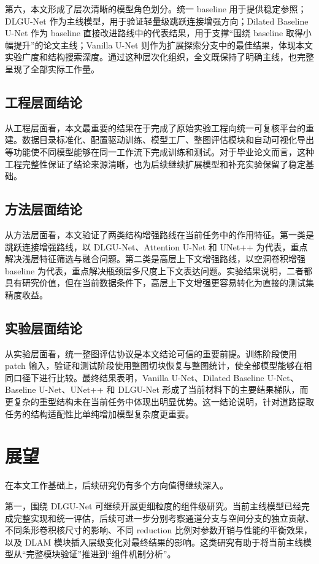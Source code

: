 第六，本文形成了层次清晰的模型角色划分。统一 baseline 用于提供稳定参照；DLGU-Net 作为主线模型，用于验证轻量级跳跃连接增强方向；Dilated Baseline U-Net 作为 baseline 直接改进路线中的代表结果，用于支撑“围绕 baseline 取得小幅提升”的论文主线；Vanilla U-Net 则作为扩展探索分支中的最佳结果，体现本文实验广度和结构搜索深度。通过这种层次化组织，全文既保持了明确主线，也完整呈现了全部实际工作量。

\subsection*{工程层面结论}
从工程层面看，本文最重要的结果在于完成了原始实验工程向统一可复核平台的重建。数据目录标准化、配置驱动训练、模型工厂、整图评估模块和自动可视化导出等功能使不同模型能够在同一工作流下完成训练和测试。对于毕业论文而言，这种工程完整性保证了结论来源清晰，也为后续继续扩展模型和补充实验保留了稳定基础。

\subsection*{方法层面结论}
从方法层面看，本文验证了两类结构增强路线在当前任务中的作用特征。第一类是跳跃连接增强路线，以 DLGU-Net、Attention U-Net 和 UNet++ 为代表，重点解决浅层特征筛选与融合问题。第二类是高层上下文增强路线，以空洞卷积增强 baseline 为代表，重点解决瓶颈层多尺度上下文表达问题。实验结果说明，二者都具有研究价值，但在当前数据条件下，高层上下文增强更容易转化为直接的测试集精度收益。

\subsection*{实验层面结论}
从实验层面看，统一整图评估协议是本文结论可信的重要前提。训练阶段使用 patch 输入，验证和测试阶段使用整图切块恢复与整图统计，使全部模型能够在相同口径下进行比较。最终结果表明，Vanilla U-Net、Dilated Baseline U-Net、Baseline U-Net、UNet++ 和 DLGU-Net 形成了当前材料下的主要结果梯队，而更复杂的重型结构未在当前任务中体现出明显优势。这一结论说明，针对道路提取任务的结构适配性比单纯增加模型复杂度更重要。

\section{展望}
在本文工作基础上，后续研究仍有多个方向值得继续深入。

第一，围绕 DLGU-Net 可继续开展更细粒度的组件级研究。当前主线模型已经完成完整实现和统一评估，后续可进一步分别考察通道分支与空间分支的独立贡献、不同条形卷积核尺寸的影响、不同 reduction 比例对参数开销与性能的平衡效果，以及 DLAM 模块插入层级变化对最终结果的影响。这类研究有助于将当前主线模型从“完整模块验证”推进到“组件机制分析”。


